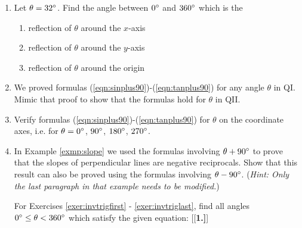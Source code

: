 \vspace{5mm}
{\small
\begin{enumerate}[\bfseries 1.]
 \item\label{exer:reflect} Let $\theta = 32^\circ$. Find the angle between $0^\circ$ and
  $360^\circ$ which is the
  \begin{enumerate}[\bfseries (a)]
   \item reflection of $\theta$ around the $x$-axis
   \item reflection of $\theta$ around the $y$-axis
   \item reflection of $\theta$ around the origin
  \end{enumerate}
 \item\label{exer:rotate90} We proved formulas (\ref{eqn:sinplus90})-(\ref{eqn:tanplus90}) for
  any angle $\theta$ in QI. Mimic that proof to show that the formulas hold for $\theta$ in QII.
 \item Verify formulas (\ref{eqn:sinplus90})-(\ref{eqn:tanplus90}) for $\theta$ on the coordinate
 axes, i.e. for $\theta = 0^\circ$, $90^\circ$, $180^\circ$, $270^\circ$.
 \item In Example \ref{exmp:slope} we used the formulas involving $\theta + 90^\circ$ to prove
  that the slopes of perpendicular lines are negative reciprocals. Show that this result can also
  be proved using the formulas involving $\theta - 90^\circ$. (\emph{Hint: Only the last paragraph
  in that example needs to be modified.})
 \par\noindent For Exercises \ref{exer:invtrigfirst} - \ref{exer:invtriglast}, find all angles
  $0^\circ \le \theta < 360^\circ$ which satisfy the given equation:
[{[\bfseries 1.]}]
 \begin{multicols}{4}

\end{multicols}
\end{enumerate}}
